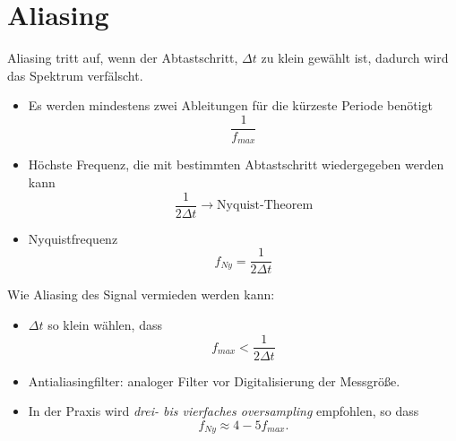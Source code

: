 \section{Aliasing}
Aliasing tritt auf, wenn der Abtastschritt, $\Delta t$ zu klein gewählt ist, dadurch wird das Spektrum verfälscht.
\begin{itemize}
\item Es werden mindestens zwei Ableitungen für die kürzeste Periode benötigt
\[
\frac{1}{f_{max}}
\]
\item Höchste Frequenz, die mit bestimmten Abtastschritt wiedergegeben werden kann
\[
\frac{1}{2\Delta t} \rightarrow \mbox{Nyquist-Theorem}
\]
\item Nyquistfrequenz
\[
f_{Ny}=\frac{1}{2 \Delta t}
\]
\end {itemize}
Wie Aliasing des Signal vermieden werden kann:
\begin{itemize}
\item $\Delta t$ so klein wählen, dass
\[
f_{max} < \frac {1}{2\Delta t}
\]
\item Antialiasingfilter: analoger Filter vor Digitalisierung der Messgröße.
\item In der Praxis wird \textit{drei- bis vierfaches oversampling} empfohlen, so dass
\[
f_{Ny}\approx 4-5 f_{max}.
\]
\end {itemize}